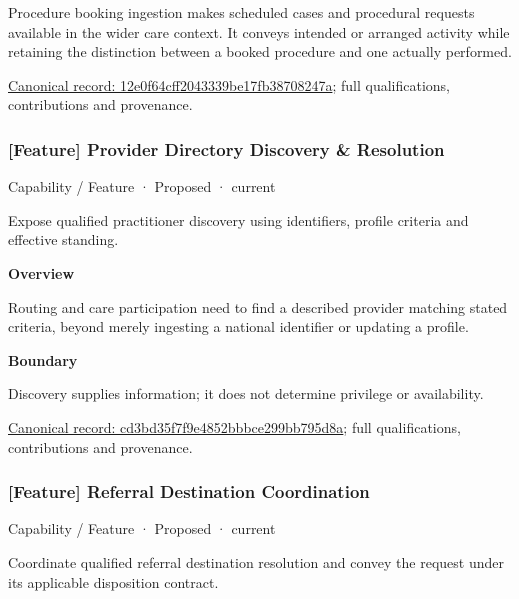 Procedure booking ingestion makes scheduled cases and procedural requests available in the wider care context. It conveys intended or arranged activity while retaining the distinction between a booked procedure and one actually performed.


{\footnotesize \href{../../../../continuum/strategy/capability/feature/12e0f64cff2043339be17fb38708247a.md}{Canonical record: 12e0f64cff2043339be17fb38708247a}; full qualifications, contributions and provenance.}\par
\subsubsection{[Feature] Provider Directory Discovery \& Resolution}

\label{element:cd3bd35f7f9e4852bbbce299bb795d8a}
{\small Capability / Feature · Proposed · current}\par

Expose qualified practitioner discovery using identifiers, profile criteria and effective standing.



\textbf{Overview}



Routing and care participation need to find a described provider matching stated criteria, beyond merely ingesting a national identifier or updating a profile.



\textbf{Boundary}



Discovery supplies information; it does not determine privilege or availability.


{\footnotesize \href{../../../../continuum/strategy/capability/feature/cd3bd35f7f9e4852bbbce299bb795d8a.md}{Canonical record: cd3bd35f7f9e4852bbbce299bb795d8a}; full qualifications, contributions and provenance.}\par
\subsubsection{[Feature] Referral Destination Coordination}

\label{element:7d7ddffcda9d4854a02be5c3265ad775}
{\small Capability / Feature · Proposed · current}\par

Coordinate qualified referral destination resolution and convey the request under its applicable disposition contract.



